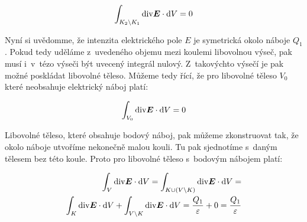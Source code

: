\begin{equation}
\int_{K_2 \setminus K_1} \mathrm{div} \boldsymbol{E} \cdot \mathrm{d}V = 0
\end{equation}


Nyní si uvědomme, že intenzita elektrického pole \(E\) je symetrická okolo náboje \(Q_1\). Pokud tedy uděláme z~uvedeného objemu mezi koulemi libovolnou výseč, pak musí i~v~tézo výseči být uvecený integrál nulový. Z~takovýchto výsečí je pak možné poskládat libovolné těleso. Můžeme tedy řící, že pro libovolné těleso \(V_0\) které neobsahuje elektrický náboj platí:

\begin{equation}
\int_{V_0} \mathrm{div} \boldsymbol{E} \cdot \mathrm{d}V = 0
\end{equation}

Libovolné těleso, které obsahuje bodový náboj, pak můžeme zkonstruovat tak, že okolo náboje utvoříme nekonečně malou kouli. Tu pak sjednotíme s~daným tělesem bez této koule. Proto pro libovolné těleso s~bodovým nábojem platí:

\begin{equation}
\begin{split}
\int_{V} \mathrm{div} \boldsymbol{E} \cdot \mathrm{d}V = \int_{K \cup (V \setminus K)} \mathrm{div} \boldsymbol{E} \cdot \mathrm{d}V = \\
\int_{K} \mathrm{div} \boldsymbol{E} \cdot \mathrm{d}V + \int_{V \setminus K} \mathrm{div} \boldsymbol{E} \cdot \mathrm{d}V = \frac{Q_1}{\varepsilon} + 0 = \frac{Q_1}{\varepsilon}
\end{split}
\end{equation}

